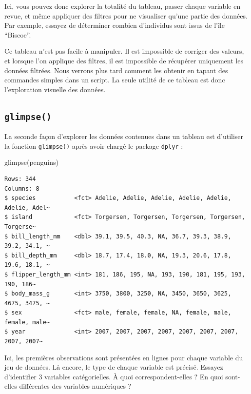 \documentclass[
  letterpaper,
  DIV=11,
  numbers=noendperiod]{scrreprt}
\newenvironment{Shaded}{\begin{snugshade}}{\end{snugshade}}
\newcommand{\FunctionTok}[1]{\textcolor[rgb]{0.28,0.35,0.67}{#1}}
\newcommand{\NormalTok}[1]{\textcolor[rgb]{0.00,0.23,0.31}{#1}}
\begin{document}
Ici, vous pouvez donc explorer la totalité du tableau, passer chaque
variable en revue, et même appliquer des filtres pour ne visualiser
qu'une partie des données. Par exemple, essayez de déterminer combien
d'individus sont issus de l'île ``Biscoe''.

Ce tableau n'est pas facile à manipuler. Il est impossible de corriger
des valeurs, et lorsque l'on applique des filtres, il est impossible de
récupérer uniquement les données filtrées. Nous verrons plus tard
comment les obtenir en tapant des commandes simples dans un script. La
seule utilité de ce tableau est donc l'exploration visuelle des données.

\hypertarget{glimpse}{%
\subsection{\texorpdfstring{\texttt{glimpse()}}{glimpse()}}\label{glimpse}}

La seconde façon d'explorer les données contenues dans un tableau est
d'utiliser la fonction \texttt{glimpse()} après avoir chargé le package
\texttt{dplyr} :

\begin{Shaded}
\begin{Highlighting}[]
\FunctionTok{glimpse}\NormalTok{(penguins)}
\end{Highlighting}
\end{Shaded}

\begin{verbatim}
Rows: 344
Columns: 8
$ species           <fct> Adelie, Adelie, Adelie, Adelie, Adelie, Adelie, Adel~
$ island            <fct> Torgersen, Torgersen, Torgersen, Torgersen, Torgerse~
$ bill_length_mm    <dbl> 39.1, 39.5, 40.3, NA, 36.7, 39.3, 38.9, 39.2, 34.1, ~
$ bill_depth_mm     <dbl> 18.7, 17.4, 18.0, NA, 19.3, 20.6, 17.8, 19.6, 18.1, ~
$ flipper_length_mm <int> 181, 186, 195, NA, 193, 190, 181, 195, 193, 190, 186~
$ body_mass_g       <int> 3750, 3800, 3250, NA, 3450, 3650, 3625, 4675, 3475, ~
$ sex               <fct> male, female, female, NA, female, male, female, male~
$ year              <int> 2007, 2007, 2007, 2007, 2007, 2007, 2007, 2007, 2007~
\end{verbatim}

Ici, les premières observations sont présentées en lignes pour chaque
variable du jeu de données. Là encore, le type de chaque variable est
précisé. Essayez d'identifier 3 variables catégorielles. À quoi
correspondent-elles ? En quoi sont-elles différentes des variables
numériques ?
\end{document}

